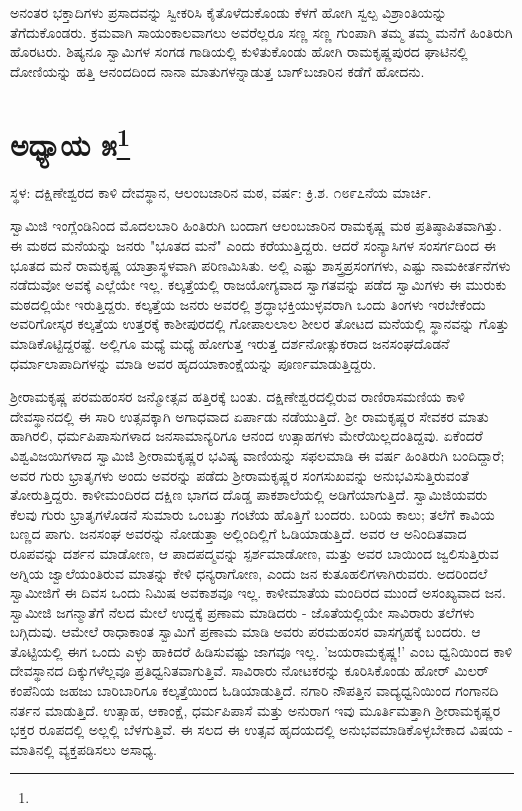 ಅನಂತರ ಭಕ್ತಾದಿಗಳು ಪ್ರಸಾದವನ್ನು ಸ್ವೀಕರಿಸಿ ಕೈತೊಳೆದುಕೊಂಡು ಕೆಳಗೆ ಹೋಗಿ ಸ್ವಲ್ಪ ವಿಶ್ರಾಂತಿಯನ್ನು ತೆಗೆದುಕೊಂಡರು. ಕ್ರಮವಾಗಿ ಸಾಯಂಕಾಲವಾಗಲು ಅವರೆಲ್ಲರೂ ಸಣ್ಣ ಸಣ್ಣ ಗುಂಪಾಗಿ ತಮ್ಮ ತಮ್ಮ ಮನೆಗೆ ಹಿಂತಿರುಗಿ ಹೊರಟರು. ಶಿಷ್ಯನೂ ಸ್ವಾಮಿಗಳ ಸಂಗಡ ಗಾಡಿಯಲ್ಲಿ ಕುಳಿತುಕೊಂಡು ಹೋಗಿ ರಾಮಕೃಷ್ಣಪುರದ ಘಾಟಿನಲ್ಲಿ ದೋಣಿಯನ್ನು ಹತ್ತಿ ಆನಂದದಿಂದ ನಾನಾ ಮಾತುಗಳನ್ನಾಡುತ್ತ ಬಾಗ್‌ಬಜಾರಿನ ಕಡೆಗೆ ಹೋದನು.

\newpage

\chapter[ಅಧ್ಯಾಯ ೫]{ಅಧ್ಯಾಯ ೫\protect\footnote{}}

\begin{center}
ಸ್ಥಳ: ದಕ್ಷಿಣೇಶ್ವರದ ಕಾಳಿ ದೇವಸ್ಥಾನ, ಆಲಂಬಜಾರಿನ ಮಠ, ವರ್ಷ: ಕ್ರಿ.ಶ. ೧೮೯೭ನೆಯ ಮಾರ್ಚಿ.
\end{center}

ಸ್ವಾಮಿಜಿ ಇಂಗ್ಲೆಂಡಿನಿಂದ ಮೊದಲಬಾರಿ ಹಿಂತಿರುಗಿ ಬಂದಾಗ ಆಲಂಬಜಾರಿನ ರಾಮಕೃಷ್ಣ ಮಠ ಪ್ರತಿಷ್ಠಾಪಿತವಾಗಿತ್ತು. ಈ ಮಠದ ಮನೆಯನ್ನು ಜನರು "ಭೂತದ ಮನೆ" ಎಂದು ಕರೆಯುತ್ತಿದ್ದರು. ಆದರೆ ಸಂನ್ಯಾಸಿಗಳ ಸಂಸರ್ಗದಿಂದ ಈ ಭೂತದ ಮನೆ ರಾಮಕೃಷ್ಣ ಯಾತ್ರಾಸ್ಥಳವಾಗಿ ಪರಿಣಮಿಸಿತು. ಅಲ್ಲಿ ಎಷ್ಟು ಶಾಸ್ತ್ರಪ್ರಸಂಗಗಳು, ಎಷ್ಟು ನಾಮಕೀರ್ತನೆಗಳು ನಡೆದುವೋ ಅವಕ್ಕೆ ಎಲ್ಲೆಯೇ ಇಲ್ಲ. ಕಲ್ಕತ್ತೆಯಲ್ಲಿ ರಾಜಯೋಗ್ಯವಾದ ಸ್ವಾಗತವನ್ನು ಪಡೆದ ಸ್ವಾಮಿಗಳು ಈ ಮುರುಕು ಮಠದಲ್ಲಿಯೇ ಇರುತ್ತಿದ್ದರು. ಕಲ್ಕತ್ತೆಯ ಜನರು ಅವರಲ್ಲಿ ಶ್ರದ್ಧಾಭಕ್ತಿಯುಳ್ಳವರಾಗಿ ಒಂದು ತಿಂಗಳು ಇರಬೇಕೆಂದು ಅವರಿಗೋಸ್ಕರ ಕಲ್ಕತ್ತೆಯ ಉತ್ತರಕ್ಕೆ ಕಾಶೀಪುರದಲ್ಲಿ ಗೋಪಾಲಲಾಲ ಶೀಲರ ತೋಟದ ಮನೆಯಲ್ಲಿ ಸ್ಥಾನವನ್ನು ಗೊತ್ತು ಮಾಡಿಕೊಟ್ಟಿದ್ದರಷ್ಟೆ. ಅಲ್ಲಿಗೂ ಮಧ್ಯೆ ಮಧ್ಯೆ ಹೋಗುತ್ತ ಇರುತ್ತ ದರ್ಶನೋತ್ಸುಕರಾದ ಜನಸಂಘದೊಡನೆ ಧರ್ಮಾಲಾಪಾದಿಗಳನ್ನು ಮಾಡಿ ಅವರ ಹೃದಯಾಕಾಂಕ್ಷೆಯನ್ನು ಪೂರ್ಣಮಾಡುತ್ತಿದ್ದರು.

ಶ‍್ರೀರಾಮಕೃಷ್ಣ ಪರಮಹಂಸರ ಜನ್ಮೋತ್ಸವ ಹತ್ತಿರಕ್ಕೆ ಬಂತು. ದಕ್ಷಿಣೇಶ್ವರದಲ್ಲಿರುವ ರಾಣಿರಾಸಮಣಿಯ ಕಾಳಿ ದೇವಸ್ಥಾನದಲ್ಲಿ ಈ ಸಾರಿ ಉತ್ಸವಕ್ಕಾಗಿ ಅಗಾಧವಾದ ಏರ್ಪಾಡು ನಡೆಯುತ್ತಿದೆ. ಶ‍್ರೀ ರಾಮಕೃಷ್ಣರ ಸೇವಕರ ಮಾತು ಹಾಗಿರಲಿ, ಧರ್ಮಪಿಪಾಸುಗಳಾದ ಜನಸಾಮಾನ್ಯರಿಗೂ ಆನಂದ ಉತ್ಸಾಹಗಳು ಮೇರೆಯಿಲ್ಲದಂತಿದ್ದವು. ಏಕೆಂದರೆ ವಿಶ್ವವಿಜಯಿಗಳಾದ ಸ್ವಾಮಿಜಿ ಶ‍್ರೀರಾಮಕೃಷ್ಣರ ಭವಿಷ್ಯ ವಾಣಿಯನ್ನು ಸಫಲಮಾಡಿ ಈ ವರ್ಷ ಹಿಂತಿರುಗಿ ಬಂದಿದ್ದಾರೆ; ಅವರ ಗುರು ಭ್ರಾತೃಗಳು ಅಂದು ಅವರನ್ನು ಪಡೆದು ಶ‍್ರೀರಾಮಕೃಷ್ಣರ ಸಂಗಸುಖವನ್ನು ಅನುಭವಿಸುತ್ತಿರುವಂತೆ ತೋರುತ್ತಿದ್ದರು. ಕಾಳೀಮಂದಿರದ ದಕ್ಷಿಣ ಭಾಗದ ದೊಡ್ಡ ಪಾಕಶಾಲೆಯಲ್ಲಿ ಅಡಿಗೆಯಾಗುತ್ತಿದೆ. ಸ್ವಾಮಿಜಿಯವರು ಕೆಲವು ಗುರು ಭ್ರಾತೃಗಳೊಡನೆ ಸುಮಾರು ಒಂಬತ್ತು ಗಂಟೆಯ ಹೊತ್ತಿಗೆ ಬಂದರು. ಬರಿಯ ಕಾಲು; ತಲೆಗೆ ಕಾವಿಯ ಬಣ್ಣದ ಪಾಗು. ಜನಸಂಘ ಅವರನ್ನು ನೋಡುತ್ತಾ ಅಲ್ಲಿಂದಿಲ್ಲಿಗೆ ಓಡಿಯಾಡುತ್ತಿದೆ. ಅವರ ಆ ಅನಿಂದಿತವಾದ ರೂಪವನ್ನು ದರ್ಶನ ಮಾಡೋಣ, ಆ ಪಾದಪದ್ಮವನ್ನು ಸ್ಪರ್ಶಮಾಡೋಣ, ಮತ್ತು ಅವರ ಬಾಯಿಂದ ಜ್ವಲಿಸುತ್ತಿರುವ ಅಗ್ನಿಯ ಜ್ವಾಲೆಯಂತಿರುವ ಮಾತನ್ನು ಕೇಳಿ ಧನ್ಯರಾಗೋಣ, ಎಂದು ಜನ ಕುತೂಹಲಿಗಳಾಗಿರುವರು. ಅದರಿಂದಲೆ ಸ್ವಾಮೀಜಿಗೆ ಈ ದಿವಸ ಒಂದು ನಿಮಿಷ ಅವಕಾಶವೂ ಇಲ್ಲ. ಕಾಳೀಮಾತೆಯ ಮಂದಿರದ ಮುಂದೆ ಅಸಂಖ್ಯವಾದ ಜನ. ಸ್ವಾಮೀಜಿ ಜಗನ್ಮಾತೆಗೆ ನೆಲದ ಮೇಲೆ ಉದ್ದಕ್ಕೆ ಪ್ರಣಾಮ ಮಾಡಿದರು - ಜೊತೆಯಲ್ಲಿಯೇ ಸಾವಿರಾರು ತಲೆಗಳು ಬಗ್ಗಿದುವು. ಆಮೇಲೆ ರಾಧಾಕಾಂತ ಸ್ವಾಮಿಗೆ ಪ್ರಣಾಮ ಮಾಡಿ ಅವರು ಪರಮಹಂಸರ ವಾಸಗೃಹಕ್ಕೆ ಬಂದರು. ಆ ತೊಟ್ಟಿಯಲ್ಲಿ ಈಗ ಒಂದು ಎಳ್ಳು ಹಾಕಿದರೆ ಹಿಡಿಸುವಷ್ಟು ಜಾಗವೂ ಇಲ್ಲ. 'ಜಯರಾಮಕೃಷ್ಣ!' ಎಂಬ ಧ್ವನಿಯಿಂದ ಕಾಳಿ ದೇವಸ್ಥಾನದ ದಿಕ್ಕುಗಳೆಲ್ಲವೂ ಪ್ರತಿಧ್ವನಿತವಾಗುತ್ತಿವೆ. ಸಾವಿರಾರು ನೋಟಕರನ್ನು ಕೂರಿಸಿಕೊಂಡು ಹೋರ್‌ ಮಿಲರ್ ಕಂಪೆನಿಯ ಜಹಜು ಬಾರಿಬಾರಿಗೂ ಕಲ್ಕತ್ತೆಯಿಂದ ಓಡಿಯಾಡುತ್ತಿದೆ. ನಗಾರಿ ನೌಪತ್ತಿನ ವಾದ್ಯಧ್ವನಿಯಿಂದ ಗಂಗಾನದಿ ನರ್ತನ ಮಾಡುತ್ತಿದೆ. ಉತ್ಸಾಹ, ಆಕಾಂಕ್ಷೆ, ಧರ್ಮಪಿಪಾಸೆ ಮತ್ತು ಅನುರಾಗ ಇವು ಮೂರ್ತಿಮತ್ತಾಗಿ ಶ‍್ರೀರಾಮಕೃಷ್ಣರ ಭಕ್ತರ ರೂಪದಲ್ಲಿ ಅಲ್ಲಲ್ಲಿ ಬೆಳಗುತ್ತಿವೆ. ಈ ಸಲದ ಈ ಉತ್ಸವ ಹೃದಯದಲ್ಲಿ ಅನುಭವಮಾಡಿಕೊಳ್ಳಬೇಕಾದ ವಿಷಯ - ಮಾತಿನಲ್ಲಿ ವ್ಯಕ್ತಪಡಿಸಲು ಅಸಾಧ್ಯ.

